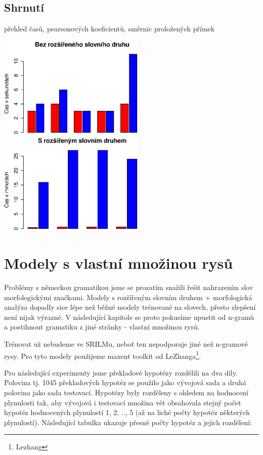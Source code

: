 \documentclass[12pt,a4paper]{report}
\begin{document}
\section{Shrnutí}
přehled časů, pearsonových koeficientů, směrnic proložených přímek
\begin{center}
	\includegraphics[width=70mm]{./grafy/morf/cas/rsd/bez.eps}
	\includegraphics[width=70mm]{./grafy/morf/cas/rsd/rsd.eps}
\end{center}

\chapter{Modely s vlastní množinou rysů}
Problémy s německou gramatikou jsme se prozatím snažili řešit nahrazením slov morfologickými značkami. Modely s rozšířeným slovním druhem + morfologická analýza dopadly sice lépe než běžné modely trénované na slovech, přesto zlepšení není nijak výrazné. V následující kapitole se proto pokusíme upustit od n-gramů a postihnout gramatiku z jiné stránky - vlastní množinou rysů.

Trénovat už nebudeme ve SRILMu, neboť ten nepodporuje jiné než n-gramové rysy. Pro tyto modely použijeme maxent toolkit od LeZhanga\footnote{Lezhang}.

Pro následující experimenty jsme překladové hypotézy rozdělili na dva díly. Polovina tj. 1045 překladových hypotéz se použilo jako vývojová sada a druhá polovina jako sada testovací. Hypotézy byly rozděleny s ohledem na hodnocení plynulosti tak, aby vývojová i testovací množina vět obsahovala stejný počet hypotéz hodnocených plynulostí 1, 2, .., 5 (až na liché počty hypotéz některých plynulostí). Následující tabulka ukazuje přesné počty hypotéz a jejich rozdělení:
\end{document}
